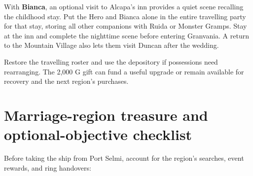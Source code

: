 With \textbf{Bianca}, an optional visit to Alcapa's inn provides
a quiet scene recalling the childhood stay. Put the Hero and Bianca
alone in the entire travelling party for that stay, storing all other
companions with Ruida or Monster Gramps. Stay at the inn and complete the
nighttime scene before entering Granvania. A return to the Mountain
Village also lets them visit Duncan after the wedding.


Restore the travelling roster and use the depository if possessions
need rearranging. The 2,000 G gift can fund a useful upgrade or remain
available for recovery and the next region's purchases.

\section{Marriage-region treasure and optional-objective checklist}

Before taking the ship from Port Selmi, account for the region's
searches, event rewards, and ring handovers:

